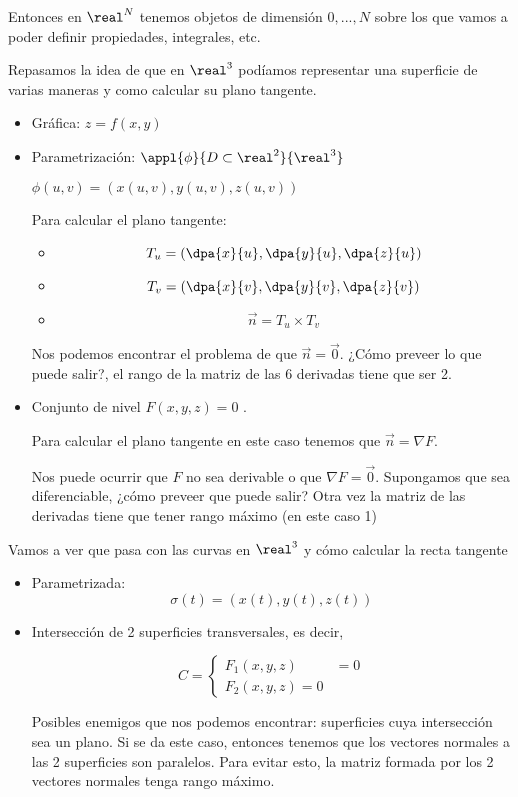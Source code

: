   Entonces en $\real^N$ tenemos objetos de dimensión $0,...,N$ sobre los que vamos a poder definir propiedades, integrales, etc.
  
  Repasamos la idea de que en $\real^3$ podíamos representar una superficie de varias maneras y como calcular su plano tangente.
  \begin{itemize}
   \item Gráfica: $z=f(x,y)$
   \item Parametrización: $\appl{\phi}{D\subset\real^2}{\real^3}$
     
     $\phi(u,v) = (x(u,v),y(u,v),z(u,v))$
     
     Para calcular el plano tangente:
     
     \begin{itemize}
      \item \[T_u = \left( \dpa{x}{u},\dpa{y}{u},\dpa{z}{u}\right)\]
      \item\[T_v = \left( \dpa{x}{v},\dpa{y}{v},\dpa{z}{v}\right)\]
      \item\[ \overrightarrow{n} = T_u\times T_v\]
     \end{itemize}

     Nos podemos encontrar el problema de que $\overrightarrow{n} = \overrightarrow{0}$. ¿Cómo preveer lo que puede salir?, el rango de la matriz de las 6 derivadas tiene que ser 2.
     
   \item Conjunto de nivel $F(x,y,z) = 0$ .
   
   Para calcular el plano tangente en este caso tenemos que $\overrightarrow{n} = \nabla F$. 
   
   Nos puede ocurrir que $F$ no sea derivable o que $\nabla F = \overrightarrow{0}$. Supongamos que sea diferenciable, ¿cómo preveer que puede salir? Otra vez la matriz de las derivadas tiene que tener rango máximo (en este caso 1)
  \end{itemize}
  
  Vamos a ver que pasa con las curvas en $\real^3$ y cómo calcular la recta tangente
  
  \begin{itemize}
   \item Parametrizada: \[\sigma(t) = (x(t),y(t),z(t))\]
   
   \item Intersección de 2 superficies transversales, es decir,
   
   \[C = \left\{\begin{array}{cc} F_1(x,y,z) &= 0\\ F_2(x,y,z) = 0 \end{array} \right.\]
   
   Posibles enemigos que nos podemos encontrar: superficies cuya intersección sea un plano. Si se da este caso, entonces tenemos que los vectores normales a las 2 superficies son paralelos. Para evitar esto, la matriz formada por los 2 vectores normales tenga rango máximo.
                                                                   
  \end{itemize}

